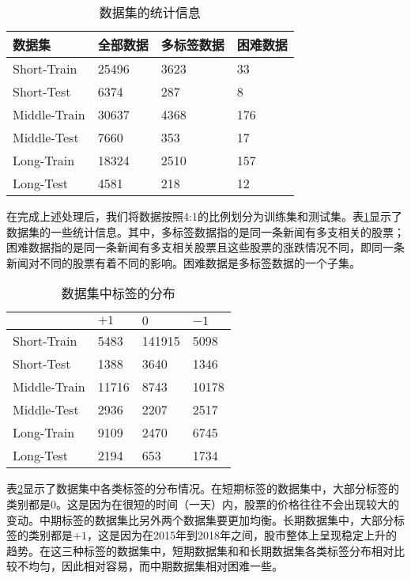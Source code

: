 \begin{table}[ht]
	\centering 
	\begin{minipage}[t]{0.8\linewidth}
		\caption[]{数据集的统计信息}
		\label{tab:datasetstatistics}
		\begin{tabularx}{1\linewidth}{lXXX}
			\toprule
			数据集 & 全部数据 & 多标签数据 & 困难数据\\ \midrule
			Short-Train & 25496 & 3623 & 33 \\ 
            Short-Test & 6374 & 287 & 8 \\ 
            Middle-Train & 30637 & 4368 & 176 \\ 
            Middle-Test & 7660 & 353 & 17 \\ 
            Long-Train & 18324 & 2510 & 157 \\
			Long-Test & 4581 & 218 & 12 \\ 
			\bottomrule
		\end{tabularx}
	\end{minipage}
\end{table}

在完成上述处理后，我们将数据按照4:1的比例划分为训练集和测试集。表\ref{tab:datasetstatistics}显示了数据集的一些统计信息。其中，多标签数据指的是同一条新闻有多支相关的股票；困难数据指的是同一条新闻有多支相关股票且这些股票的涨跌情况不同，即同一条新闻对不同的股票有着不同的影响。困难数据是多标签数据的一个子集。

\begin{table}[ht]
	\centering
	\begin{minipage}[t]{0.8\linewidth}
		\caption{数据集中标签的分布}
		\label{tab:labeldistribution}
		\begin{tabularx}{\linewidth}{lXXX}
			\toprule 
			& $+1$ & $0$ & $-1$ \\ \midrule  
			Short-Train & 5483 & 141915 & 5098 \\ 
			Short-Test & 1388 & 3640 &1346 \\
			Middle-Train & 11716 & 8743 & 10178 \\
			Middle-Test & 2936 & 2207 & 2517 \\ 
			Long-Train & 9109 & 2470 & 6745 \\ 
			Long-Test & 2194 & 653 & 1734\\ 
			\bottomrule
		\end{tabularx}
	\end{minipage}
\end{table}

表\ref{tab:labeldistribution}显示了数据集中各类标签的分布情况。在短期标签的数据集中，大部分标签的类别都是$0$。这是因为在很短的时间（一天）内，股票的价格往往不会出现较大的变动。中期标签的数据集比另外两个数据集要更加均衡。长期数据集中，大部分标签的类别都是$+1$，这是因为在2015年到2018年之间，股市整体上呈现稳定上升的趋势。在这三种标签的数据集中，短期数据集和和长期数据集各类标签分布相对比较不均匀，因此相对容易，而中期数据集相对困难一些。

